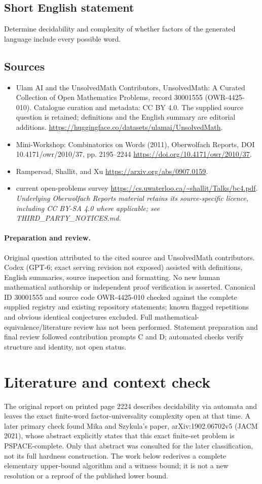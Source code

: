\documentclass[11pt]{article}
\begin{document}
\subsection{Short English statement}
Determine decidability and complexity of whether factors of the generated language include every possible word.
\subsection{Sources}
\begin{itemize}
\item[S1] Ulam AI and the UnsolvedMath Contributors, UnsolvedMath: A Curated Collection of Open Mathematics Problems, record 30001555 (OWR-4425-010). Catalogue curation and metadata: CC BY 4.0. The supplied source question is retained; definitions and the English summary are editorial additions.
\url{https://huggingface.co/datasets/ulamai/UnsolvedMath}.
\item[S2] Mini-Workshop: Combinatorics on Words (2011), Oberwolfach Reports, DOI 10.4171/owr/2010/37, pp. 2195--2244
\url{https://doi.org/10.4171/owr/2010/37}.
\item[S3] Rampersad, Shallit, and Xu
\url{https://arxiv.org/abs/0907.0159}.
\item[S4] current open-problems survey
\url{https://cs.uwaterloo.ca/~shallit/Talks/bc4.pdf}.
\textit{Underlying Oberwolfach Reports material retains its source-specific licence, including CC BY-SA 4.0 where applicable; see THIRD\_PARTY\_NOTICES.md.}
\end{itemize}
\paragraph{Preparation and review.}
Original question attributed to the cited source and UnsolvedMath contributors. Codex (GPT-6; exact serving revision not exposed) assisted with definitions, English summaries, source inspection and formatting. No new human mathematical authorship or independent proof verification is asserted. Canonical ID 30001555 and source code OWR-4425-010 checked against the complete supplied registry and existing repository statements; known flagged repetitions and obvious identical conjectures excluded. Full mathematical-equivalence/literature review has not been performed. Statement preparation and final review followed contribution prompts C and D; automated checks verify structure and identity, not open status.
\label{end:30001555}

\section{Literature and context check}
The original report on printed page 2224 describes decidability via automata and leaves the exact finite-word factor-universality complexity open at that time. A later primary check found Mika and Szykula's paper, arXiv:1902.06702v5 (JACM 2021), whose abstract explicitly states that this exact finite-set problem is PSPACE-complete. Only that abstract was consulted for the later classification, not its full hardness construction. The work below rederives a complete elementary upper-bound algorithm and a witness bound; it is not a new resolution or a reproof of the published lower bound.
\end{document}
